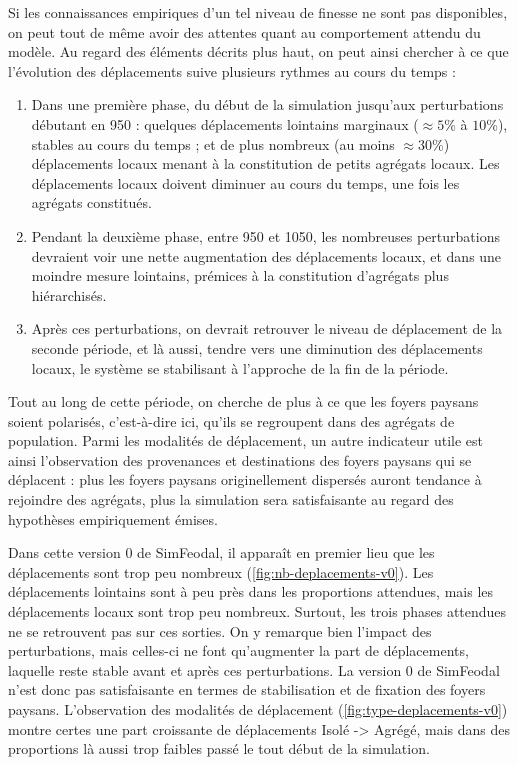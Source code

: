 Si les connaissances empiriques d'un tel niveau de finesse ne sont pas disponibles, on peut tout de même avoir des attentes quant au comportement attendu du modèle.
Au regard des éléments décrits plus haut, on peut ainsi chercher à ce que l'évolution des déplacements suive plusieurs rythmes au cours du temps :
\begin{enumerate}
\item Dans une première phase, du début de la simulation jusqu'aux perturbations débutant en 950 :
quelques déplacements lointains marginaux ($\approx 5$\% à $10$\%), stables au cours du temps ; et de plus nombreux (au moins $\approx 30$\%) déplacements locaux menant à la constitution de petits agrégats locaux.
Les déplacements locaux doivent diminuer au cours du temps, une fois les agrégats constitués.
\item Pendant la deuxième phase, entre 950 et 1050, les nombreuses perturbations devraient voir une nette augmentation des déplacements locaux, et dans une moindre mesure lointains, prémices à la constitution d'agrégats plus hiérarchisés.
\item Après ces perturbations, on devrait retrouver le niveau de déplacement de la seconde période, et là aussi, tendre vers une diminution des déplacements locaux, le système se stabilisant à l'approche de la fin de la période.
\end{enumerate}

Tout au long de cette période, on cherche de plus à ce que les foyers paysans soient polarisés, c'est-à-dire ici, qu'ils se regroupent dans des agrégats de population.
Parmi les modalités de déplacement, un autre indicateur utile est ainsi l'observation des provenances et destinations des foyers paysans qui se déplacent :
plus les foyers paysans originellement dispersés auront tendance à rejoindre des agrégats, plus la simulation sera satisfaisante au regard des hypothèses empiriquement émises.


\begin{mdframed}[backgroundcolor=gray!10,footnoteinside=false]
Dans cette version 0 de SimFeodal, il apparaît en premier lieu que les déplacements sont trop peu nombreux (\cref{fig:nb-deplacements-v0}).
Les déplacements lointains sont à peu près dans les proportions attendues, mais les déplacements locaux sont trop peu nombreux.
Surtout, les trois phases attendues ne se retrouvent pas sur ces sorties.
On y remarque bien l'impact des perturbations, mais celles-ci ne font qu'augmenter la part de déplacements, laquelle reste stable avant et après ces perturbations.
La version 0 de SimFeodal n'est donc pas satisfaisante en termes de stabilisation et de fixation des foyers paysans.
L'observation des modalités de déplacement (\cref{fig:type-deplacements-v0}) montre certes une part croissante de déplacements \og Isolé -> Agrégé\fg{}, mais dans des proportions là aussi trop faibles passé le tout début de la simulation.
\end{mdframed}

